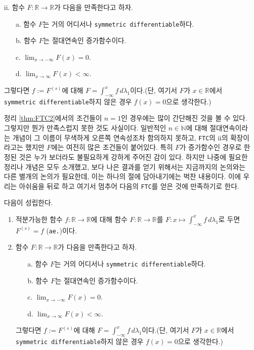  ii. 함수 $F:\mathbb{R}\to\mathbb{R}$가 다음을 만족한다고 하자.
\begin{enumerate}
    \item[a.] 함수 $F$는 거의 어디서나 \texttt{symmetric differentiable}하다.
    \item[b.] 함수 $F$는 절대연속인 증가함수이다.
    \item[c.] $\lim_{x\to-\infty}F(x)=0$.
    \item[d.] $\lim_{x\to\infty}F(x)<\infty$.
\end{enumerate}
그렇다면 $f:=F^{(s)}$에 대해 $F=\int_{-\infty}^xf\,d\lambda_1$이다.(단, 여기서 $F$가 $x\in\mathbb{R}$에서 \texttt{symmetric differentiable}하지 않은 경우 $f(x)=0$으로 생각한다.)

\vspace{6pt}
정리 \ref{thm:FTC2}에서의 조건들이 $n=1$인 경우에는 많이 간단해진 것을 볼 수 있다. 그렇지만 뭔가 만족스럽지 못한 것도 사실이다. 일반적인 $n\in\mathbb{N}$에 대해 절대연속이라는 개념이 그 이름이 무색하게 오른쪽 연속성조차 함의하지 못하고, \texttt{FTC}의 ii의 확장이라고는 했지만 $F$에는 여전히 많은 조건들이 붙어있다. 특히 $F$가 증가함수인 경우로 한정된 것은 누가 보더라도 불필요하게 강하게 주어진 감이 있다. 하지만 나중에 필요한 정리나 개념은 모두 소개했고, 보다 나은 결과를 얻기 위해서는 지금까지의 논의와는 다른 별개의 논의가 필요한데, 이는 하나의 절에 담아내기에는 벅찬 내용이다. 이에 우리는 아쉬움을 뒤로 하고 여기서 멈추어 다음의 \texttt{FTC}를 얻은 것에 만족하기로 한다.\footnotemark

\begin{theorem}
    다음이 성립한다.
    \begin{enumerate}
        \item 적분가능한 함수 $f:\mathbb{R}\to\mathbb{R}$에 대해 함수 $F:\mathbb{R}\to\mathbb{R}$를 $F:x\mapsto\int_{-\infty}^xf\,d\lambda_1$로 두면 $F^{(s)}=f$ (\texttt{ae.})이다.
        \item 함수 $F:\mathbb{R}\to\mathbb{R}$가 다음을 만족한다고 하자.
        \begin{enumerate}
            \item[a.] 함수 $F$는 거의 어디서나 \texttt{symmetric differentiable}하다.
            \item[b.] 함수 $F$는 절대연속인 증가함수이다.
            \item[c.] $\lim_{x\to-\infty}F(x)=0$.
            \item[d.] $\lim_{x\to\infty}F(x)<\infty$.
        \end{enumerate}
        그렇다면 $f:=F^{(s)}$에 대해 $F=\int_{-\infty}^xf\,d\lambda_1$이다.(단, 여기서 $F$가 $x\in\mathbb{R}$에서 \texttt{symmetric differentiable}하지 않은 경우 $f(x)=0$으로 생각한다.)
    \end{enumerate}
\end{theorem}

